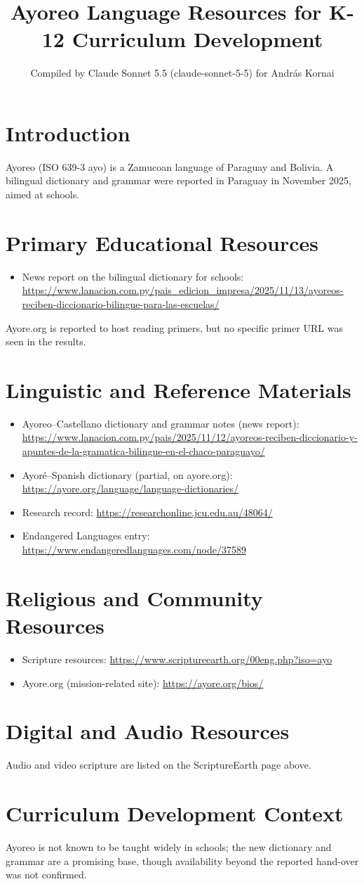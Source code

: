 \documentclass[12pt]{article}
\title{Ayoreo Language Resources for K-12 Curriculum Development}
\author{Compiled by Claude Sonnet 5.5 (claude-sonnet-5-5) for Andr\'as Kornai}
\date{}
\begin{document}
\maketitle
\section{Introduction}
Ayoreo (ISO 639-3 ayo) is a Zamucoan language of Paraguay and Bolivia. A bilingual dictionary and grammar were reported in Paraguay in November 2025, aimed at schools.
\section{Primary Educational Resources}
\begin{itemize}
\item News report on the bilingual dictionary for schools: \url{https://www.lanacion.com.py/pais_edicion_impresa/2025/11/13/ayoreos-reciben-diccionario-bilingue-para-las-escuelas/}
\end{itemize}
Ayore.org is reported to host reading primers, but no specific primer URL was seen in the results.
\section{Linguistic and Reference Materials}
\begin{itemize}
\item Ayoreo--Castellano dictionary and grammar notes (news report): \url{https://www.lanacion.com.py/pais/2025/11/12/ayoreos-reciben-diccionario-y-apuntes-de-la-gramatica-bilingue-en-el-chaco-paraguayo/}
\item Ayor\'e--Spanish dictionary (partial, on ayore.org): \url{https://ayore.org/language/language-dictionaries/}
\item Research record: \url{https://researchonline.jcu.edu.au/48064/}
\item Endangered Languages entry: \url{https://www.endangeredlanguages.com/node/37589}
\end{itemize}
\section{Religious and Community Resources}
\begin{itemize}
\item Scripture resources: \url{https://www.scriptureearth.org/00eng.php?iso=ayo}
\item Ayore.org (mission-related site): \url{https://ayore.org/bios/}
\end{itemize}
\section{Digital and Audio Resources}
Audio and video scripture are listed on the ScriptureEarth page above.
\section{Curriculum Development Context}
Ayoreo is not known to be taught widely in schools; the new dictionary and grammar are a promising base, though availability beyond the reported hand-over was not confirmed.
\end{document}

